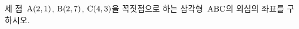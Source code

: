 세 점~$\mathrm{A}(2{,}\mkern3mu\mathopen{}1)$, $\mathrm{B}(2{,}\mkern3mu\mathopen{}7)$, $\mathrm{C}(4{,}\mkern3mu\mathopen{}3)$을 꼭짓점으로 하는 삼각형~$\mathrm{ABC}$의 외심의 좌표를 구하시오.
